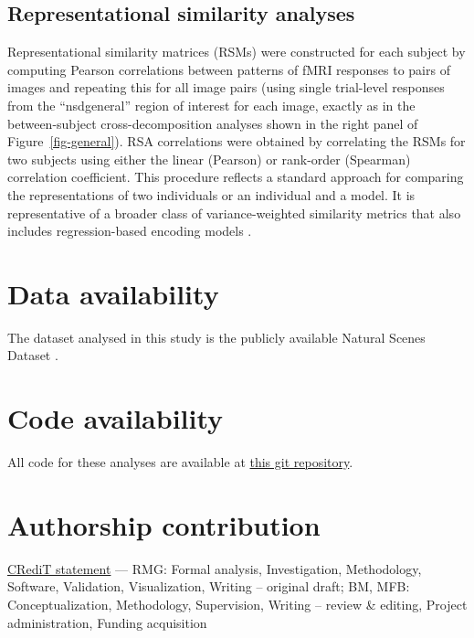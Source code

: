 \documentclass[10pt]{article}
\begin{document}
\subsection{Representational similarity
analyses}\label{representational-similarity-analyses}

Representational similarity matrices (RSMs) were constructed for each
subject by computing Pearson correlations between patterns of fMRI
responses to pairs of images and repeating this for all image pairs
(using single trial-level responses from the ``nsdgeneral'' region of
interest for each image, exactly as in the between-subject
cross-decomposition analyses shown in the right panel of
Figure~\ref{fig-general}). RSA correlations were obtained by correlating
the RSMs for two subjects using either the linear (Pearson) or
rank-order (Spearman) correlation coefficient. This procedure reflects a
standard approach for comparing the representations of two individuals
or an individual and a model. It is representative of a broader class of
variance-weighted similarity metrics that also includes regression-based
encoding models \autocite{Kriegeskorte2019,Kornblith2019}.

\section{Data availability}\label{data-availability}

The dataset analysed in this study is the publicly available Natural
Scenes Dataset \autocite{Allen2021}.

\section{Code availability}\label{code-availability}

All code for these analyses are available at
\href{https://github.com/BonnerLab/scale-free-visual-cortex}{this git
repository}.

\section{Authorship contribution}\label{authorship-contribution}

\href{https://credit.niso.org/}{CRediT statement} --- RMG: Formal
analysis, Investigation, Methodology, Software, Validation,
Visualization, Writing -- original draft; BM, MFB: Conceptualization,
Methodology, Supervision, Writing -- review \& editing, Project
administration, Funding acquisition
\end{document}
